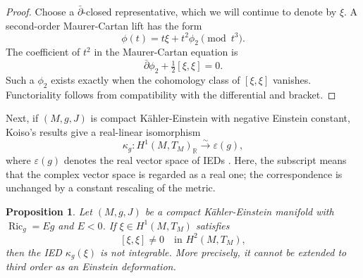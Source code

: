 \documentclass[11pt]{amsart}
\numberwithin{equation}{section}
\theoremstyle{plain}
\newtheorem{proposition}[theorem]{Proposition}
\theoremstyle{definition}
\newcommand{\R}{\mathbb{R}}
\newcommand{\dbar}{\bar\partial}
\newcommand{\half}{\tfrac12}
\newcommand{\iso}{\xrightarrow{\sim}}
\DeclareMathOperator{\Ric}{Ric}
\begin{document}
\begin{proof}
Choose a $\dbar$-closed representative, which we will continue to denote by $\xi$. A second-order Maurer-Cartan lift has the form
$$\phi(t)=t\xi+t^2\phi_2\pmod{t^3}.$$
The coefficient of $t^2$ in the Maurer-Cartan equation is
$$\dbar\phi_2+\half[\xi,\xi]=0.$$
Such a $\phi_2$ exists exactly when the cohomology class of $[\xi,\xi]$ vanishes. Functoriality follows from compatibility with the differential and bracket.
\end{proof}

Next, if $(M,g,J)$ is compact K\"ahler-Einstein with negative Einstein constant, Koiso's results give a real-linear isomorphism
\begin{equation}\label{eq:koiso}
\kappa_g\colon H^1(M,T_M)_{\R}\iso\varepsilon(g),
\end{equation}
where $\varepsilon(g)$ denotes the real vector space of IEDs \cite[Lem.~6.6, Props.~7.3, 8.2-8.3, and Lem.~9.3]{Koiso}. Here, the subscript means that the complex vector space is regarded as a real one; the correspondence is unchanged by a constant rescaling of the metric.

\begin{proposition}\label{prop:bridge}
Let $(M,g,J)$ be a compact K\"ahler-Einstein manifold with $\Ric_g=Eg$ and $E<0$. If $\xi\in H^1(M,T_M)$ satisfies
$$[\xi,\xi]\neq0\quad\text{in }H^2(M,T_M),$$
then the IED $\kappa_g(\xi)$ is not integrable. More precisely, it cannot be extended to third order as an Einstein deformation.
\end{proposition}
\end{document}
